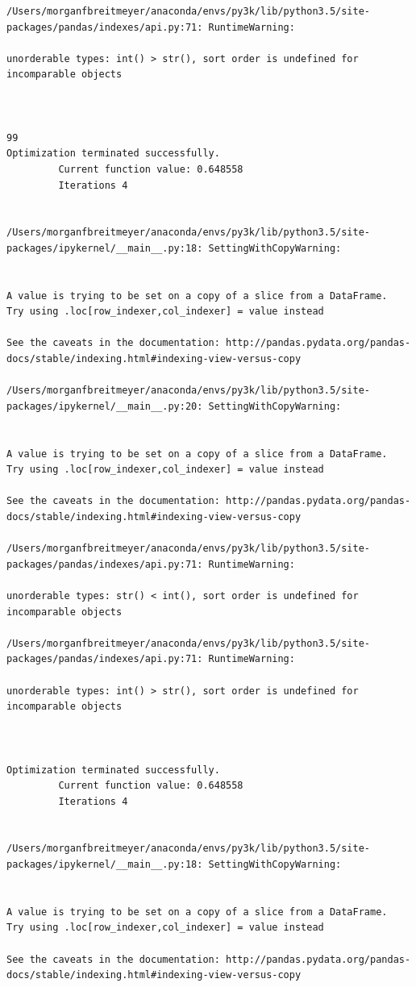 \begin{lstlisting}
/Users/morganfbreitmeyer/anaconda/envs/py3k/lib/python3.5/site-packages/pandas/indexes/api.py:71: RuntimeWarning:

unorderable types: int() > str(), sort order is undefined for incomparable objects



99
Optimization terminated successfully.
         Current function value: 0.648558
         Iterations 4


/Users/morganfbreitmeyer/anaconda/envs/py3k/lib/python3.5/site-packages/ipykernel/__main__.py:18: SettingWithCopyWarning:


A value is trying to be set on a copy of a slice from a DataFrame.
Try using .loc[row_indexer,col_indexer] = value instead

See the caveats in the documentation: http://pandas.pydata.org/pandas-docs/stable/indexing.html#indexing-view-versus-copy

/Users/morganfbreitmeyer/anaconda/envs/py3k/lib/python3.5/site-packages/ipykernel/__main__.py:20: SettingWithCopyWarning:


A value is trying to be set on a copy of a slice from a DataFrame.
Try using .loc[row_indexer,col_indexer] = value instead

See the caveats in the documentation: http://pandas.pydata.org/pandas-docs/stable/indexing.html#indexing-view-versus-copy

/Users/morganfbreitmeyer/anaconda/envs/py3k/lib/python3.5/site-packages/pandas/indexes/api.py:71: RuntimeWarning:

unorderable types: str() < int(), sort order is undefined for incomparable objects

/Users/morganfbreitmeyer/anaconda/envs/py3k/lib/python3.5/site-packages/pandas/indexes/api.py:71: RuntimeWarning:

unorderable types: int() > str(), sort order is undefined for incomparable objects



Optimization terminated successfully.
         Current function value: 0.648558
         Iterations 4


/Users/morganfbreitmeyer/anaconda/envs/py3k/lib/python3.5/site-packages/ipykernel/__main__.py:18: SettingWithCopyWarning:


A value is trying to be set on a copy of a slice from a DataFrame.
Try using .loc[row_indexer,col_indexer] = value instead

See the caveats in the documentation: http://pandas.pydata.org/pandas-docs/stable/indexing.html#indexing-view-versus-copy


\end{lstlisting}
